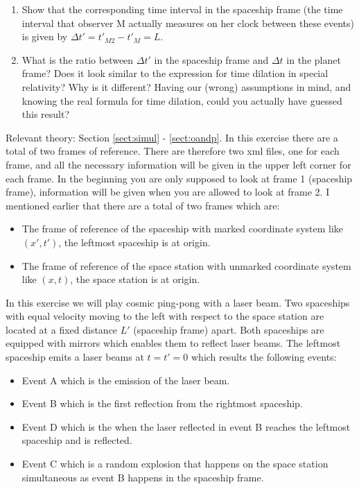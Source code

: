 {\begin{multicols}{2}
\begin{enumerate}
\item Show that the corresponding time interval in the spaceship
frame (the time interval that observer M actually measures on her clock between these events) is given by $\Delta t'=t'_{M2}-t'_{M}=L$.

\item What is the ratio between $\Delta t'$ in the spaceship frame and $\Delta t$ in the planet frame? Does it look similar to the expression for time dilation in special relativity? Why is it different? Having our (wrong) assumptions in mind, and knowing the real formula for time dilation, could you actually have guessed this result?
\end{enumerate}


\vspace{0.5cm}


Relevant theory: Section \ref{sect:simul} - \ref{sect:oandp}.\newline
In this exercise there are a total of two frames of reference. There are therefore two xml files, one for each frame, and all the necessary information will be given in the upper left corner for each frame. In the beginning you are only supposed to look at frame 1 (spaceship frame), information will be given when you are allowed to look at frame 2. I mentioned earlier that there are a total of two frames which are:
\begin{itemize}
\item The frame of reference of the spaceship with marked coordinate system like $(x',t')$, the leftmost spaceship is at origin.
\item The frame of reference of the space station with unmarked coordinate system like $(x,t)$, the space station is at origin.
\end{itemize}

In this exercise we will play cosmic ping-pong with a laser beam. Two spaceships with equal velocity moving to the left with respect to the space station are located at a fixed distance $L'$ (spaceship frame) apart. Both spaceships are equipped with mirrors which enables them to reflect laser beams. The leftmost spaceship emits a laser beams at $t=t'=0$ which results the following events:
\begin{itemize}
\item Event A which is the emission of the laser beam.
\item Event B which is the first reflection from the rightmost spaceship.
\item Event D which is the when the laser reflected in event B reaches the leftmost spaceship and is reflected.
\item Event C which is a random explosion that happens on the space station simultaneous as event B happens in the spaceship frame.
\end{itemize}


\end{multicols}}
